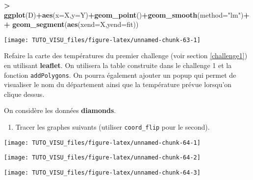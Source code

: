 \documentclass[]{article}
\newenvironment{Shaded}{\begin{snugshade}}{\end{snugshade}}
\newcommand{\DataTypeTok}[1]{\textcolor[rgb]{0.13,0.29,0.53}{#1}}
\newcommand{\KeywordTok}[1]{\textcolor[rgb]{0.13,0.29,0.53}{\textbf{#1}}}
\newcommand{\NormalTok}[1]{#1}
\newcommand{\OperatorTok}[1]{\textcolor[rgb]{0.81,0.36,0.00}{\textbf{#1}}}
\newcommand{\StringTok}[1]{\textcolor[rgb]{0.31,0.60,0.02}{#1}}
\providecommand{\tightlist}{%
  \setlength{\itemsep}{0pt}\setlength{\parskip}{0pt}}
\theoremstyle{definition}
\theoremstyle{definition}
\theoremstyle{definition}
\theoremstyle{remark}
\let\BeginKnitrBlock\begin \let\EndKnitrBlock\end
\begin{document}
\begin{Shaded}
\begin{Highlighting}[]
\OperatorTok{>}\StringTok{ }\KeywordTok{ggplot}\NormalTok{(D)}\OperatorTok{+}\KeywordTok{aes}\NormalTok{(}\DataTypeTok{x=}\NormalTok{X,}\DataTypeTok{y=}\NormalTok{Y)}\OperatorTok{+}\KeywordTok{geom_point}\NormalTok{()}\OperatorTok{+}\KeywordTok{geom_smooth}\NormalTok{(}\DataTypeTok{method=}\StringTok{"lm"}\NormalTok{)}\OperatorTok{+}
\OperatorTok{+}\StringTok{   }\KeywordTok{geom_segment}\NormalTok{(}\KeywordTok{aes}\NormalTok{(}\DataTypeTok{xend=}\NormalTok{X,}\DataTypeTok{yend=}\NormalTok{fit))}
\end{Highlighting}
\end{Shaded}

\begin{center}\texttt{[image: TUTO\_VISU\_files/figure-latex/unnamed-chunk-63-1]} \end{center}

\BeginKnitrBlock{exercise}[Challenge]
\protect\hypertarget{exr:ggplot-challenge}{}{\label{exr:ggplot-challenge} \iffalse (Challenge) \fi{} }

Refaire la carte des températures du premier challenge (voir section \ref{challenge1}) en utilisant \textbf{leaflet}. On utilisera la table construite dans le challenge 1 et la fonction \texttt{addPolygons}. On pourra également ajouter un popup qui permet de visualiser le nom du département ainsi que la température prévue lorsqu'on clique dessus.
\EndKnitrBlock{exercise}

On considère les données \textbf{diamonds}.

\begin{enumerate}
\def\labelenumi{\arabic{enumi}.}
\tightlist
\item
  Tracer les graphes suivants (utiliser \texttt{coord\_flip} pour le second).
\end{enumerate}

\begin{center}\texttt{[image: TUTO\_VISU\_files/figure-latex/unnamed-chunk-64-1]} \end{center}

\begin{center}\texttt{[image: TUTO\_VISU\_files/figure-latex/unnamed-chunk-64-2]} \end{center}

\begin{center}\texttt{[image: TUTO\_VISU\_files/figure-latex/unnamed-chunk-64-3]} \end{center}
\end{document}
